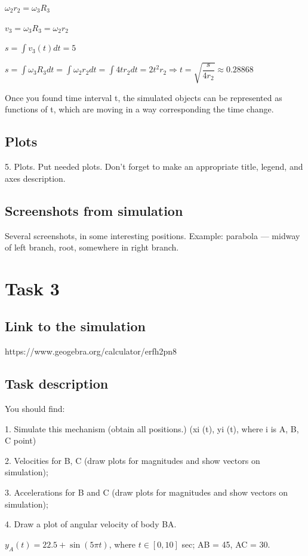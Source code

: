 \documentclass{article}
\begin{document}
$\omega_2 r_2 = \omega_3 R_3 $

$v_3 = \omega_3 R_3 = \omega_2 r_2$

\( s = \int v_3(t) dt = 5\)

\( s = \int \omega_3 R_3 dt = \int \omega_2 r_2 dt  = \int 4t r_2 dt = 2t^2 r_2 \Rightarrow t = \sqrt{\dfrac{s}{4 r_2}} \approx 0.28868\)  


Once you found time interval t, the simulated objects can be represented as functions of t, which are moving in a way corresponding
the time change.

\subsection{Plots}
5. Plots. Put needed plots. Don’t forget to make an appropriate title, legend, and axes description.
\subsection{Screenshots from simulation}

Several screenshots, in some interesting positions. Example: parabola —
midway of left branch, root, somewhere in right branch.


\section{Task 3}

\subsection{Link to the simulation}

https://www.geogebra.org/calculator/erfh2pn8

\subsection{Task description}

You should find:

1. Simulate this mechanism (obtain all positions.)
(xi (t), yi (t), where i is A, B, C point)

2. Velocities for B, C (draw plots for magnitudes and
show vectors on simulation);

3. Accelerations for B and C (draw plots for
magnitudes and show vectors on simulation);

4. Draw a plot of angular velocity of body BA.

$y_A(t) = 22.5 + \sin(5\pi t)$, where $t \in [0, 10]$ sec; AB = 45, AC = 30.
\end{document}
